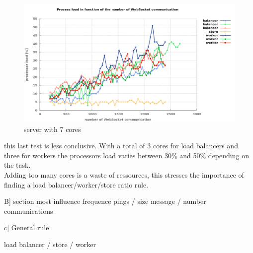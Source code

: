 \begin{figure}[H]
	\centering
		\includegraphics[width=\textwidth]{./Figures/WS_server_3rising.png}
	\caption[WebSocket server on seven cores]{server with 7 cores}
	\label{fig:WS_server_3rising}
\end{figure}

this last test is less conclusive. With a total of 3 cores for load balancers
and three for workers the processors load varies between 30\% and 50\%
depending on the task.\\

Adding too many cores is a waste of ressources, this stresses the importance of
finding a load balancer/worker/store ratio rule.


B] section most influence frequence pings / size message / number communications

c] General rule

load balancer / store / worker

